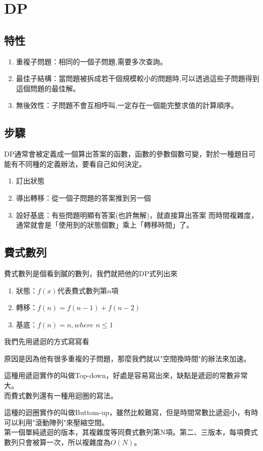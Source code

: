 \section{DP}
\subsection{特性}
\begin{enumerate}
\item 重複子問題：相同的一個子問題,需要多次查詢。
\item 最佳子結構：當問題被拆成若干個規模較小的問題時,可以透過這些子問題得到這個問題的最佳解。
\item 無後效性：子問題不會互相呼叫,一定存在一個能完整求值的計算順序。
\end{enumerate}
\subsection{步驟}
DP通常會被定義成一個算出答案的函數，函數的參數個數可變，對於一種題目可能有不同種的定義辦法，要看自己如何決定。
\begin{enumerate}
\item 訂出狀態
\item 導出轉移：從一個子問題的答案推到另一個
\item 設好基底：有些問題明顯有答案(也許無解)，就直接算出答案
而時間複雜度，通常就會是「使用到的狀態個數」乘上「轉移時間」了。
\end{enumerate}
\subsection{費式數列}
費式數列是個看到膩的數列，我們就把他的DP式列出來
\begin{enumerate}
\item 狀態：$f(x)$代表費式數列第$n$項
\item 轉移：$f(n)=f(n-1)+f(n-2)$
\item 基底：$f(n)=n,where$ $n\leq 1$
\end{enumerate}
我們先用遞迴的方式寫寫看

原因是因為他有很多重複的子問題，那麼我們就以"空間換時間"的辦法來加速。

這種用遞迴實作的叫做Top-down，好處是容易寫出來，缺點是遞迴的常數非常大。\\
而費式數列還有一種用迴圈的寫法。

這種的迴圈實作的叫做Buttom-up，雖然比較難寫，但是時間常數比遞迴小，有時可以利用"滾動陣列"來壓縮空間。\\
第一個單純遞迴的版本，其複雜度等同費式數列第N項。第二、三版本，每項費式數列只會被算一次，所以複雜度為$O(N)$。

